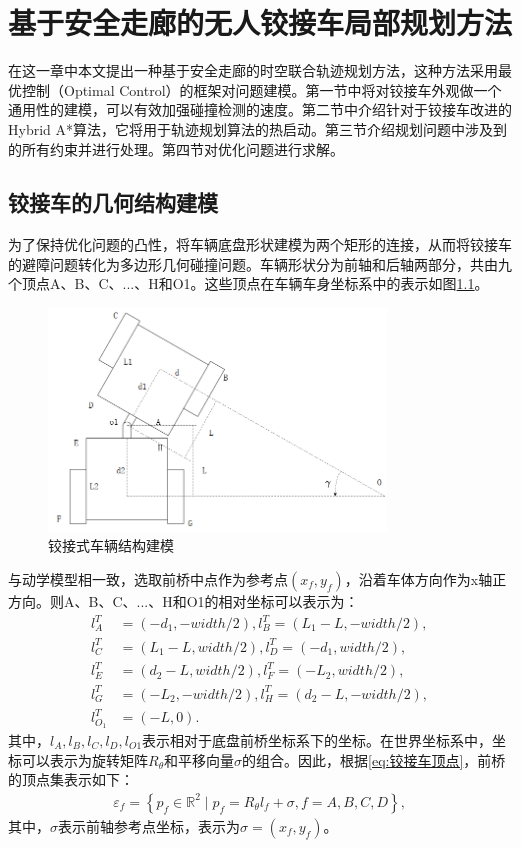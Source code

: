 \documentclass[master,academic]{ysuthesis} %
\begin{document}
	\chapter{基于安全走廊的无人铰接车局部规划方法}
	在这一章中本文提出一种基于安全走廊的时空联合轨迹规划方法，这种方法采用最优控制（Optimal Control）的框架对问题建模。第一节中将对铰接车外观做一个通用性的建模，可以有效加强碰撞检测的速度。第二节中介绍针对于铰接车改进的Hybrid A*算法，它将用于轨迹规划算法的热启动。第三节介绍规划问题中涉及到的所有约束并进行处理。第四节对优化问题进行求解。
	\section{铰接车的几何结构建模}
	为了保持优化问题的凸性，将车辆底盘形状建模为两个矩形的连接，从而将铰接车的避障问题转化为多边形几何碰撞问题。车辆形状分为前轴和后轴两部分，共由九个顶点A、B、C、...、H和O1。这些顶点在车辆车身坐标系中的表示如图\ref{fig:铰接车外观结构建模}。
	\begin{figure}[!ht]
		\centering
		\includegraphics[width=0.8\textwidth]{ppi.png}
		\caption{铰接式车辆结构建模}
		\label{fig:铰接车外观结构建模}
	\end{figure}

	与动学模型相一致，选取前桥中点作为参考点$(x_f,y_f)$，沿着车体方向作为x轴正方向。则A、B、C、...、H和O1的相对坐标可以表示为：
	\begin{equation}
		\begin{aligned}
			l_{A}^{T}&=( -d_1,-width/2 ) ,l_{B}^{T}=( L_1-L,-width/2 ) ,\\
			l_{C}^{T}&=( L_1-L,width/2 ) ,l_{D}^{T}=( -d_1,width/2 ) ,\\
			l_{E}^{T}&=( d_2-L,width/2 ) ,l_{F}^{T}=( -L_2,width/2 ) ,\\
			l_{G}^{T}&=( -L_2,-width/2 ) ,l_{H}^{T}=( d_2-L,-width/2 ) ,\\
			l_{O_1}^{T}&=( -L,0 ) .
		\end{aligned}
		\label{eq:铰接车顶点}
	\end{equation}
	其中，$l_A,l_B,l_C,l_D,l_{O1}$表示相对于底盘前桥坐标系下的坐标。在世界坐标系中，坐标可以表示为旋转矩阵$R_\theta$和平移向量$\sigma$的组合。因此，根据\ref{eq:铰接车顶点}，前桥的顶点集表示如下：
	\begin{equation}
	\begin{aligned}
		\varepsilon_f = \left\{ p_f \in \mathbb{R}^2 \mid p_f=R_\theta l_f+\sigma,  f = A,B,C,D \right\},
	\end{aligned} 
	\end{equation}
	其中，$\sigma$表示前轴参考点坐标，表示为$\sigma=(x_f,y_f)$。
	
\end{document}
